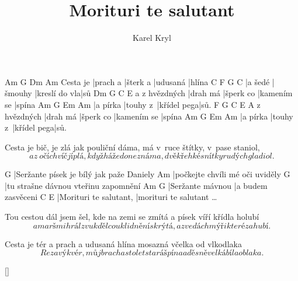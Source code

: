 \documentclass{song}
\title{Morituri te salutant}
\author{Karel Kryl}
\begin{document}
\strophe
         Am       G        Dm       Am
Cesta je |prach a |šterk a |udusaná |hlína
C       F       G\7           C
|a šedé |šmouhy |kreslí do vla|sů
              Dm       G         C           E
a z hvězdných |drah má |šperk co |kamením se |spína
Am       G        Em          Am
|a pírka |touhy z~|křídel pega|sů.
              F        G         C           E
A z hvězdných |drah má |šperk co |kamením se |spína
Am       G        Em          Am
|a pírka |touhy z~|křídel pega|sů.
\endstrophe

\strophe*
Cesta je bič, je zlá jak pouliční dáma,
má v~ruce štítky, v~pase staniol,
\[ a z~očí chvíč jí plá, když háže do neznáma,
dvě křehké snítky rudých gladiol. \]
\endstrophe

G
|Seržante písek je bílý jak paže Daniely
Am
|počkejte chvíli mé oči uviděly
G
|tu strašne dávnou vteřinu zapomnění
Am               G\7
|Seržante mávnou |a budem zasvěceni
C                      E
|Morituri te salutant, |morituri te salutant \ldots
\endstrophe

\strophe*
Tou cestou dál jsem šel, kde na zemi se zmítá
a písek víří křídla holubí
\[ a marš mi hrál zvuk děl co uklidnění skrýtá,
a zvedá chmýři které zahubí. \]
\endstrophe

\strophe*
Cesta je tér a prach a udusaná hlína
mosazná včelka od vlkodlaka
\[ Rezavý kvér, můj brach a sto let stará špína
a děsně velká bíla oblaka. \]
\endstrophe

\ref{}
\end{document}
